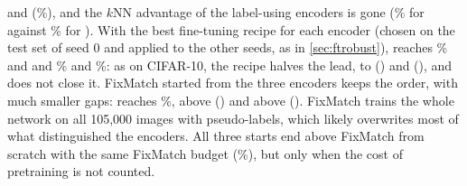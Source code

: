 \pt and \pt
(\%), and the $k$NN advantage of the label-using encoders is gone
(\% for \simclr against \% for \supcon).
With the best fine-tuning recipe for each encoder (chosen on the test set of seed 0 and applied to the
other seeds, as in \cref{sec:ftrobust}), \simclr reaches \% and \supcon and
\union {}\% and \%: as on CIFAR-10, the recipe halves the
lead, to \pt () and
\pt (), and does not close it.
FixMatch started from the three encoders keeps the order, with much smaller gaps: \simclr reaches
\%, \pt above \supcon
() and \pt above \union
(). FixMatch trains the whole network on all 105,000 images with
pseudo-labels, which likely overwrites most of what distinguished the encoders. All three starts end above
FixMatch from scratch with the same FixMatch budget (\%), but only when the cost of
pretraining is not counted.

